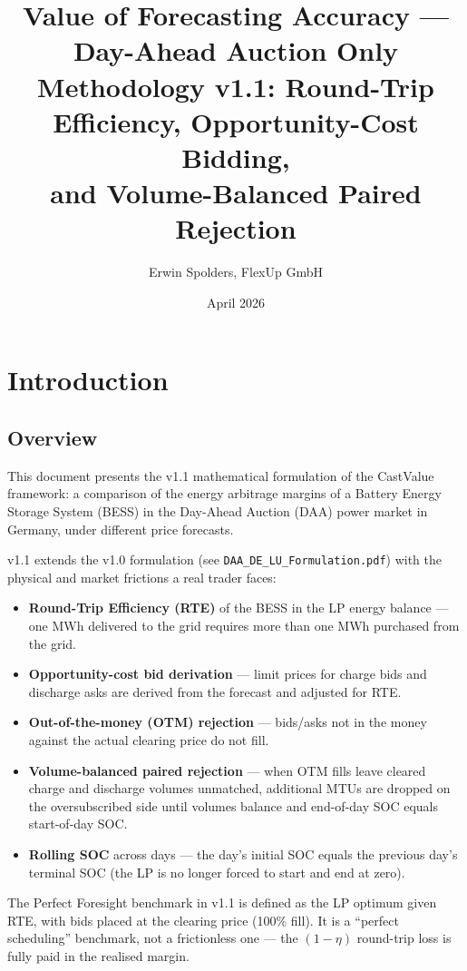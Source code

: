 \documentclass{article}
\title{Value of Forecasting Accuracy --- Day-Ahead Auction Only \\
\large Methodology v1.1: Round-Trip Efficiency, Opportunity-Cost Bidding,\\
and Volume-Balanced Paired Rejection}
\author{Erwin Spolders, FlexUp GmbH}
\date{April 2026}
\numberwithin{equation}{subsection}
\begin{document}
\maketitle

\section{Introduction}

\subsection*{Overview}
This document presents the v1.1 mathematical formulation of the CastValue framework: a comparison of the energy arbitrage margins of a Battery Energy Storage System (BESS) in the Day-Ahead Auction (DAA) power market in Germany, under different price forecasts.

v1.1 extends the v1.0 formulation (see \texttt{DAA\_DE\_LU\_Formulation.pdf}) with the physical and market frictions a real trader faces:

\begin{itemize}[itemsep=2pt, topsep=2pt]
    \item \textbf{Round-Trip Efficiency (RTE)} of the BESS in the LP energy balance --- one MWh delivered to the grid requires more than one MWh purchased from the grid.
    \item \textbf{Opportunity-cost bid derivation} --- limit prices for charge bids and discharge asks are derived from the forecast and adjusted for RTE.
    \item \textbf{Out-of-the-money (OTM) rejection} --- bids/asks not in the money against the actual clearing price do not fill.
    \item \textbf{Volume-balanced paired rejection} --- when OTM fills leave cleared charge and discharge volumes unmatched, additional MTUs are dropped on the oversubscribed side until volumes balance and end-of-day SOC equals start-of-day SOC.
    \item \textbf{Rolling SOC} across days --- the day's initial SOC equals the previous day's terminal SOC (the LP is no longer forced to start and end at zero).
\end{itemize}

The Perfect Foresight benchmark in v1.1 is defined as the LP optimum given RTE, with bids placed at the clearing price (100\% fill). It is a ``perfect scheduling'' benchmark, not a frictionless one --- the $(1-\eta)$ round-trip loss is fully paid in the realised margin.
\end{document}

